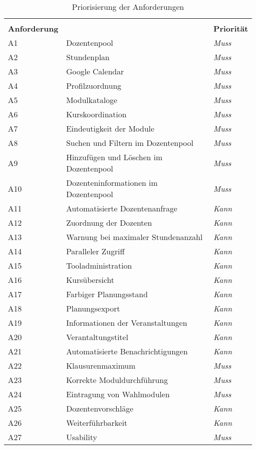 \begin{table}[h]
	\centering
	\begin{tabular}{|l|p{8cm}|l|}
		\hline &&\\[-0.5em]
		\textbf{Anforderung} & \head{Kurztitel} & \textbf{Priorität} \\ \hline
		A1 & Dozentenpool & \textit{Muss} \\ \hline
		A2 & Stundenplan & \textit{Muss} \\ \hline
		A3 & Google Calendar & \textit{Muss} \\ \hline
		A4 & Profilzuordnung & \textit{Muss} \\ \hline
		A5 & Modulkataloge & \textit{Muss} \\ \hline
		A6 & Kurskoordination & \textit{Muss} \\ \hline
		A7 & Eindeutigkeit der Module & \textit{Muss} \\ \hline
		A8 & Suchen und Filtern im Dozentenpool & \textit{Muss} \\ \hline
		A9 & Hinzufügen und Löschen im Dozentenpool & \textit{Muss} \\ \hline
		A10 & Dozenteninformationen im Dozentenpool & \textit{Muss} \\ \hline
		A11 & Automatisierte Dozentenanfrage & \textit{Kann} \\ \hline
		A12 & Zuordnung der Dozenten & \textit{Kann} \\ \hline
		A13 & Warnung bei maximaler Stundenanzahl & \textit{Kann} \\ \hline
		A14 & Paralleler Zugriff & \textit{Kann} \\ \hline
		A15 & Tooladministration & \textit{Kann} \\ \hline
		A16 & Kursübersicht & \textit{Kann} \\ \hline
		A17 & Farbiger Planungsstand & \textit{Kann} \\ \hline
		A18 & Planungsexport & \textit{Kann} \\ \hline
		A19 & Informationen der Veranstaltungen & \textit{Kann} \\ \hline
		A20 & Verantaltungstitel & \textit{Kann} \\ \hline
		A21 & Automatisierte Benachrichtigungen & \textit{Kann} \\ \hline
		A22 & Klausurenmaximum & \textit{Muss} \\ \hline
		A23 & Korrekte Moduldurchführung & \textit{Muss} \\ \hline
		A24 & Eintragung von Wahlmodulen & \textit{Muss} \\ \hline
		A25 & Dozentenvorschläge & \textit{Kann} \\ \hline
		A26 & Weiterführbarkeit & \textit{Kann} \\ \hline
		A27 & Usability & \textit{Muss} \\ \hline
	\end{tabular}
	\captionsetup{format=hang}
	\caption{\label{tab:prios}Priorisierung der Anforderungen \\}
\end{table}


